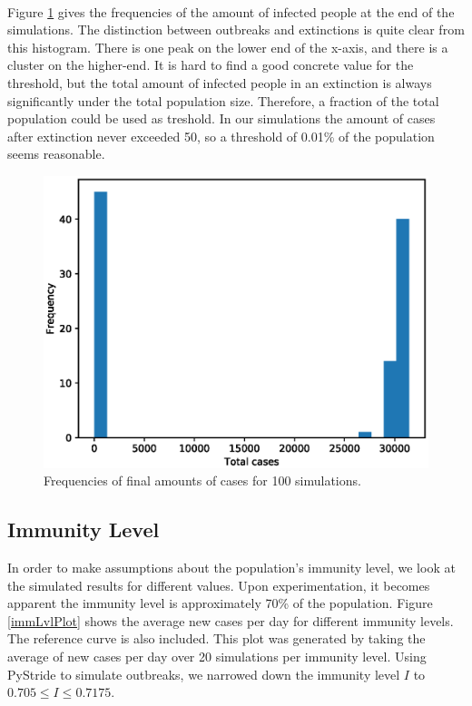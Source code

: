 \documentclass[runningheads]{llncs}
\begin{document}
\paragraph{}
Figure \ref{ETHist} gives the frequencies of the amount of infected people at the end of the simulations. The distinction between outbreaks and extinctions is quite clear from this histogram. There is one peak on the lower end of the x-axis, and there is a cluster on the higher-end. It is hard to find a good concrete value for the threshold, but the total amount of infected people in an extinction is always significantly under the total population size. Therefore, a fraction of the total population could be used as treshold. In our simulations the amount of cases after extinction never exceeded 50, so a threshold of 0.01\% of the population seems reasonable.

\begin{figure}[!h]
	\includegraphics[width=\textwidth]{Hist.eps}
	\caption{Frequencies of final amounts of cases for 100 simulations.} 
	\label{ETHist}
\end{figure}

\subsection{Immunity Level}
In order to make assumptions about the population's immunity level, we look at the simulated results for different values. Upon experimentation, it becomes apparent the immunity level is approximately 70\% of the population. Figure \ref{immLvlPlot} shows the average new cases per day for different immunity levels. The reference curve is also included. This plot was generated by taking the average of new cases per day over 20 simulations per immunity level. Using PyStride to simulate outbreaks, we narrowed down the immunity level $I$ to \( 0.705 \leq I \leq 0.7175 \).
\end{document}
